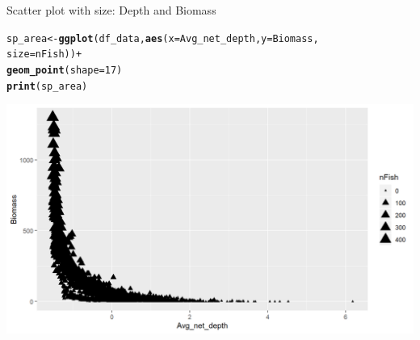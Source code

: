 \documentclass{beamer}\usepackage[]{graphicx}\usepackage[]{color}
\makeatletter
\newcommand{\hlnum}[1]{\textcolor[rgb]{0.686,0.059,0.569}{#1}}%
\newcommand{\hlopt}[1]{\textcolor[rgb]{0,0,0}{#1}}%
\newcommand{\hlstd}[1]{\textcolor[rgb]{0.345,0.345,0.345}{#1}}%
\newcommand{\hlkwb}[1]{\textcolor[rgb]{0.69,0.353,0.396}{#1}}%
\newcommand{\hlkwc}[1]{\textcolor[rgb]{0.333,0.667,0.333}{#1}}%
\newcommand{\hlkwd}[1]{\textcolor[rgb]{0.737,0.353,0.396}{\textbf{#1}}}%
\newenvironment{kframe}{%
 \def\at@end@of@kframe{}%
 \ifinner\ifhmode%
  \def\at@end@of@kframe{\end{minipage}}%
  \begin{minipage}{\columnwidth}%
 \fi\fi%
 \def\FrameCommand##1{\hskip\@totalleftmargin \hskip-\fboxsep
 \colorbox{shadecolor}{##1}\hskip-\fboxsep
     \hskip-\linewidth \hskip-\@totalleftmargin \hskip\columnwidth}%
 \MakeFramed {\advance\hsize-\width
   \@totalleftmargin\z@ \linewidth\hsize
   \@setminipage}}%
 {\par\unskip\endMakeFramed%
 \at@end@of@kframe}
\newenvironment{knitrout}{}{} %
\makeatother
\begin{document}
\begin{frame}[fragile]{Scatter plot with size: Depth and Biomass}
\begin{knitrout}\footnotesize
{}\color{fgcolor}\begin{kframe}
\begin{alltt}
\hlstd{sp_area} \hlkwb{<-} \hlkwd{ggplot}\hlstd{(df_data,} \hlkwd{aes}\hlstd{(}\hlkwc{x}\hlstd{=Avg_net_depth,} \hlkwc{y}\hlstd{=Biomass,}
                               \hlkwc{size}\hlstd{=nFish))} \hlopt{+}
  \hlkwd{geom_point}\hlstd{(}\hlkwc{shape}\hlstd{=}\hlnum{17}\hlstd{)}
\hlkwd{print}\hlstd{(sp_area)}
\end{alltt}
\end{kframe}

{\centering \includegraphics[width=.9\linewidth]{figure/sp_color_size-1} 

}



\end{knitrout}
\end{frame}
\end{document}

